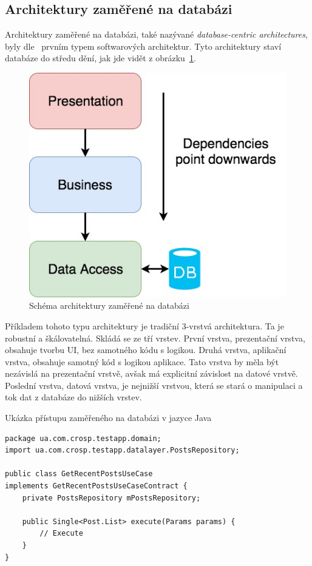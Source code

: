 \subsection{Architektury zaměřené na databázi}

Architektury zaměřené na databázi,
také nazývané \emph{database-centric architectures},
byly dle~\cite{architecture} prvním typem softwarových architektur.
Tyto architektury staví databáze do středu dění,
jak jde vidět z obrázku~\ref{fig:architecture_database}.

\begin{figure}
    \centering
    \includegraphics[width=0.5\linewidth]{assets/technology-research/architecture/database-centric.jpg}
    \caption{Schéma architektury zaměřené na databázi ~\cite{architecture}}
    \label{fig:architecture_database}
\end{figure}

Příkladem tohoto typu architektury je tradiční 3-vrstvá architektura.
Ta je robustní a škálovatelná.
Skládá se ze tří vrstev.
První vrstva,
prezentační vrstva,
obsahuje tvorbu UI,
bez samotného kódu s logikou.
Druhá vrstva,
aplikační vrstva,
obsahuje samotný kód s logikou aplikace.
Tato vrstva by měla být nezávislá na prezentační vrstvě,
avšak má explicitní závislost na datové vrstvě.
Poslední vrstva,
datová vrstva,
je nejnižší vrstvou,
která se stará o manipulaci a tok dat z databáze do
nižších vrstev.~\cite{architecture}

\begin{listing}
    \caption{Ukázka přístupu zaměřeného na databázi v jazyce Java~\cite{architecture}}
    \label{code:architecture-database}
    \begin{verbatim}
package ua.com.crosp.testapp.domain;
import ua.com.crosp.testapp.datalayer.PostsRepository;

public class GetRecentPostsUseCase
implements GetRecentPostsUseCaseContract {
    private PostsRepository mPostsRepository;

    public Single<Post.List> execute(Params params) {
        // Execute
    }
}
    \end{verbatim}
\end{listing}

